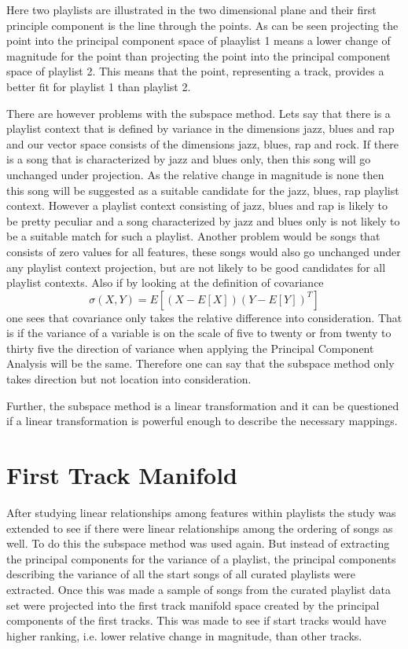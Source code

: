 \documentclass[a4paper,11pt]{kth-mag}
\begin{document}
Here two playlists are illustrated in the two dimensional plane and their first principle component is the line through the points. As can be seen projecting the point into the principal component space of plaaylist 1 means a lower change of magnitude for the point than projecting the point into the principal component space of playlist 2. This means that the point, representing a track, provides a better fit for playlist 1 than playlist 2.

There are however problems with the subspace method. Lets say that there is a playlist context that is defined by variance in the dimensions jazz, blues and rap and our vector space consists of the dimensions jazz, blues, rap and rock. If there is a song that is characterized by jazz and blues only, then this song will go unchanged under projection. As the relative change in magnitude is none then this song will be suggested as a suitable candidate for the jazz, blues, rap playlist context. However a playlist context consisting of jazz, blues and rap is likely to be pretty peculiar and a song characterized by jazz and blues only is not likely to be a suitable match for such a playlist. Another problem would be songs that consists of zero values for all features, these songs would also go unchanged under any playlist context projection, but are not likely to be good candidates for all playlist contexts. Also if by looking at the definition of covariance 
\begin{equation}
\sigma(X, Y) = E[(X - E[X]) (Y - E[Y])^T]
\end{equation} 
one sees that covariance only takes the relative difference into consideration. That is if the variance of a variable is on the scale of five to twenty or from twenty to thirty five the direction of variance when applying the Principal Component Analysis will be the same. Therefore one can say that the subspace method only takes direction but not location into consideration.

Further, the subspace method is a linear transformation and it can be questioned if a linear transformation is powerful enough to describe the necessary mappings.

\section{First Track Manifold}
After studying linear relationships among features within playlists the study was extended to see if there were linear relationships among the ordering of songs as well. To do this the subspace method was used again. But instead of extracting the principal components for the variance of a playlist, the principal components describing the variance of all the start songs of all curated playlists were extracted. Once this was made a sample of songs from the curated playlist data set were projected into the first track manifold space created by the principal components of the first tracks. This was made to see if start tracks would have higher ranking, i.e. lower relative change in magnitude, than other tracks.
\end{document}
